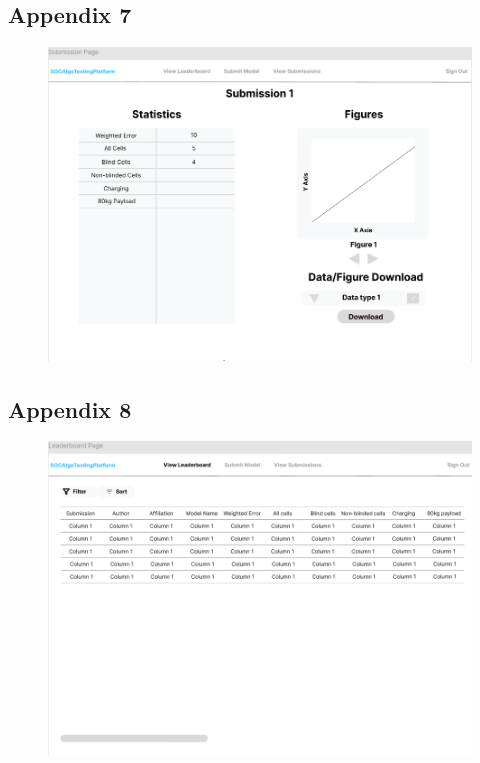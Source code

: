 \documentclass[12pt, titlepage]{article}
\begin{document}
\subsection{Appendix 7} \label{Appendix 7}
\begin{figure}[H]
    \centering
    \includegraphics[width=1\linewidth]{.//Interface/Submission.png}
\end{figure}
\subsection{Appendix 8} \label{Appendix 8}
\begin{figure}[H]
    \centering
    \includegraphics[width=1\linewidth]{.//Interface/Leaderboard.png}
\end{figure}
\end{document}
